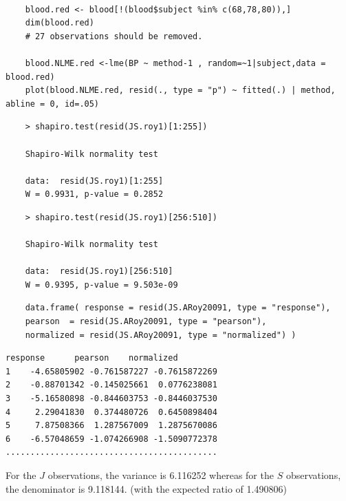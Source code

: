 \documentclass[Main.tex]{subfiles}
\begin{document}
\begin{framed}
	\begin{verbatim}
	
	blood.red <- blood[!(blood$subject %in% c(68,78,80)),]
	dim(blood.red)
	# 27 observations should be removed.
	
	blood.NLME.red <-lme(BP ~ method-1 , random=~1|subject,data = blood.red)
	plot(blood.NLME.red, resid(., type = "p") ~ fitted(.) | method, abline = 0, id=.05)
	\end{verbatim}
\end{framed}


\begin{framed}
	\begin{verbatim}
	> shapiro.test(resid(JS.roy1)[1:255])
	
	Shapiro-Wilk normality test
	
	data:  resid(JS.roy1)[1:255]
	W = 0.9931, p-value = 0.2852
	\end{verbatim}
\end{framed}

\begin{framed}
	\begin{verbatim}
	> shapiro.test(resid(JS.roy1)[256:510])
	
	Shapiro-Wilk normality test
	
	data:  resid(JS.roy1)[256:510]
	W = 0.9395, p-value = 9.503e-09
	\end{verbatim}
\end{framed}
%		



\begin{framed}
	\begin{verbatim}
	data.frame( response = resid(JS.ARoy20091, type = "response"), 
	pearson  = resid(JS.ARoy20091, type = "pearson"), 
	normalized = resid(JS.ARoy20091, type = "normalized") )
	\end{verbatim}
\end{framed}

\begin{verbatim}
response      pearson    normalized
1    -4.65805902 -0.761587227 -0.7615872269
2    -0.88701342 -0.145025661  0.0776238081
3    -5.16580898 -0.844603753 -0.8446037530
4     2.29041830  0.374480726  0.6450898404
5     7.87508366  1.287567009  1.2875670086
6    -6.57048659 -1.074266908 -1.5090772378
...........................................
\end{verbatim}
For the $J$ observations, the variance is 6.116252 whereas for the $S$ observations, the denominator is 9.118144. (with the expected ratio of  1.490806)
\end{document}
